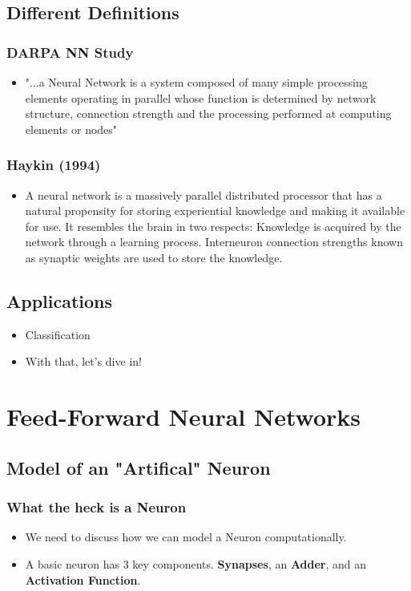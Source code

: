 \documentclass{beamer}
\begin{document}
\subsection{Different Definitions}
\begin{frame}
\frametitle{DARPA NN Study}
\begin{itemize}
	\item "...a Neural Network is a system composed of many simple processing elements operating in parallel whose function is determined by network structure, connection strength and the processing performed at computing elements or nodes"
\end{itemize}
\end{frame}

\begin{frame}
\frametitle{Haykin (1994)}
\begin{itemize}
\item A neural network is a massively parallel distributed processor that has a natural propensity for storing experiential knowledge and making it available for use. It resembles the brain in two respects: 
  Knowledge is acquired by the network through a learning process. 
  Interneuron connection strengths known as synaptic weights are used to store the knowledge.
\end{itemize}
\end{frame}
\subsection{Applications}
\begin{frame}
\begin{itemize}
\item Classification
\end{itemize}
\end{frame}

\begin{frame}
\begin{itemize}
\item With that, let's dive in!
\end{itemize}
\end{frame}

\section{Feed-Forward Neural Networks}
\subsection{Model of an "Artifical" Neuron}
\begin{frame}
\frametitle{What the heck is a Neuron}
\begin{itemize}
	\item We need to discuss how we can model a Neuron computationally. 
    \item A basic neuron has 3 key components. \textbf{Synapses}, an \textbf{Adder}, and an \textbf{Activation Function}.
\end{itemize}

\end{frame}
\end{document}
